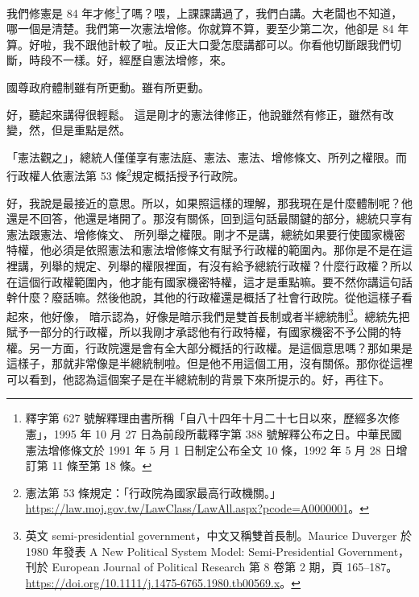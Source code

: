 \hypertarget{c11:cue:262}{}我們修憲是 84 年才修\footnote{釋字第 627 號解釋理由書所稱「自八十四年十月二十七日以來，歷經多次修憲」，1995 年 10 月 27 日為前段所載釋字第 388 號解釋公布之日。中華民國憲法增修條文於 1991 年 5 月 1 日制定公布全文 10 條，1992 年 5 月 28 日增訂第 11 條至第 18 條。}了嗎？喂，上課課講過了，我們白講。大老闆也不知道，哪一個是清楚。我們第一次憲法增修。你就算不算，要至少第二次，他卻是 84 年算。好啦，我不跟他計較了啦。反正大口愛怎麼講都可以。你看他切斷跟我們切斷，時段不一樣。好，經歷自憲法增修，來。

\hypertarget{c11:cue:263}{}國尊政府體制雖有所更動。雖有所更動。\par{}好，聽起來講得很輕鬆。
\hypertarget{c11:cue:264}{}這是剛才的憲法律修正，他說雖然有修正，雖然有改變，然，但是重點是然。

\hypertarget{c11:cue:265}{}「憲法觀之」，總統人僅僅享有憲法庭、憲法、憲法、增修條文、所列之權限。而行政權人依憲法第 53 條\footnote{憲法第 53 條規定：「行政院為國家最高行政機關。」\url{https://law.moj.gov.tw/LawClass/LawAll.aspx?pcode=A0000001}。}規定概括授予行政院。\par{}好，我說是最接近的意思。所以，如果照這樣的理解，那我現在是什麼體制呢？他還是不回答，他還是堵開了。那沒有關係，回到這句話最關鍵的部分，總統只享有憲法跟憲法、增修條文、
\hypertarget{c11:cue:266}{}所列舉之權限。剛才不是講，總統如果要行使國家機密特權，他必須是依照憲法和憲法增修條文有賦予行政權的範圍內。那你是不是在這裡講，列舉的規定、列舉的權限裡面，有沒有給予總統行政權？什麼行政權？所以在這個行政權範圍內，他才能有國家機密特權，這才是重點嘛。要不然你講這句話幹什麼？廢話嘛。然後他說，其他的行政權還是概括了社會行政院。從他這樣子看起來，他好像，
\hypertarget{c11:cue:267}{}暗示認為，好像是暗示我們是雙首長制或者半總統制\footnote{英文 semi-presidential government，中文又稱雙首長制。Maurice Duverger 於 1980 年發表 A New Political System Model: Semi-Presidential Government，刊於 European Journal of Political Research 第 8 卷第 2 期，頁 165–187。\url{https://doi.org/10.1111/j.1475-6765.1980.tb00569.x}。}。總統先把賦予一部分的行政權，所以我剛才承認他有行政特權，有國家機密不予公開的特權。另一方面，行政院還是會有全大部分概括的行政權。是這個意思嗎？那如果是這樣子，那就非常像是半總統制啦。但是他不用這個工用，沒有關係。那你從這裡可以看到，他認為這個案子是在半總統制的背景下來所提示的。好，再往下。

